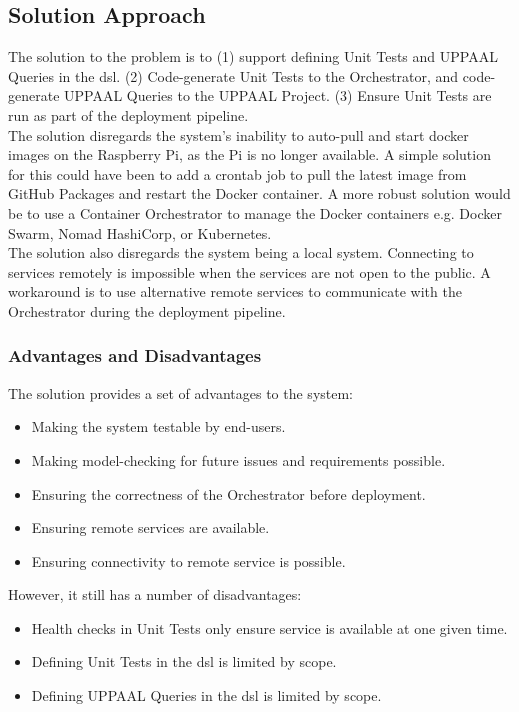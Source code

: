 \subsection{Solution Approach}

The solution to the problem is to (1) support defining Unit Tests and UPPAAL Queries in the \acrshort{dsl}. (2) Code-generate Unit Tests to the Orchestrator, and code-generate UPPAAL Queries to the UPPAAL Project. (3) Ensure Unit Tests are run as part of the deployment pipeline.\\

The solution disregards the system's inability to auto-pull and start docker images on the Raspberry Pi, as the Pi is no longer available. A simple solution for this could have been to add a crontab job to pull the latest image from GitHub Packages and restart the Docker container. A more robust solution would be to use a Container Orchestrator to manage the Docker containers e.g. Docker Swarm, Nomad HashiCorp, or Kubernetes.\\

The solution also disregards the system being a local system. Connecting to services remotely is impossible when the services are not open to the public. A workaround is to use alternative remote services to communicate with the Orchestrator during the deployment pipeline.\\

\subsubsection{Advantages and Disadvantages}
The solution provides a set of advantages to the system:

\begin{itemize}
    \item Making the system testable by end-users.
    \item Making model-checking for future issues and requirements possible.
    \item Ensuring the correctness of the Orchestrator before deployment.
    \item Ensuring remote services are available.
    \item Ensuring connectivity to remote service is possible.
\end{itemize}

However, it still has a number of disadvantages:

\begin{itemize}
    \item Health checks in Unit Tests only ensure service is available at one given time.
    \item Defining Unit Tests in the \acrshort{dsl} is limited by scope.
    \item Defining UPPAAL Queries in the \acrshort{dsl} is limited by scope.
\end{itemize}
